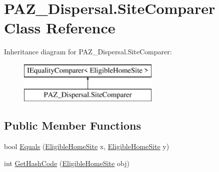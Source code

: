 \hypertarget{class_p_a_z___dispersal_1_1_site_comparer}{\section{P\-A\-Z\-\_\-\-Dispersal.\-Site\-Comparer Class Reference}
\label{class_p_a_z___dispersal_1_1_site_comparer}
}
Inheritance diagram for P\-A\-Z\-\_\-\-Dispersal.\-Site\-Comparer\-:\begin{figure}[H]
\begin{center}
\leavevmode
\includegraphics[height=2.000000cm]{class_p_a_z___dispersal_1_1_site_comparer}
\end{center}
\end{figure}
\subsection*{Public Member Functions}
\begin{DoxyCompactItemize}
\item 
bool \hyperlink{class_p_a_z___dispersal_1_1_site_comparer_a952024eef0c3deb1281e3b37563e75da}{Equals} (\hyperlink{class_p_a_z___dispersal_1_1_eligible_home_site}{Eligible\-Home\-Site} x, \hyperlink{class_p_a_z___dispersal_1_1_eligible_home_site}{Eligible\-Home\-Site} y)
\item 
int \hyperlink{class_p_a_z___dispersal_1_1_site_comparer_aec61b31657a96bc980471820572a7610}{Get\-Hash\-Code} (\hyperlink{class_p_a_z___dispersal_1_1_eligible_home_site}{Eligible\-Home\-Site} obj)
\end{DoxyCompactItemize}


